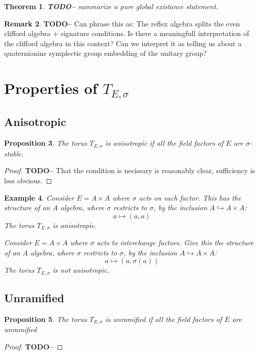 \documentclass{article}
\theoremstyle{plain}
\newtheorem{theorem}{Theorem}[section]
\newtheorem{proposition}[theorem]{Proposition}
\newtheorem{example}[theorem]{Example}
\theoremstyle{definition}
\newtheorem{remark}[theorem]{Remark}
\newcommand{\TODO}[1]{\textbf{TODO-#1}}
\begin{document}
\begin{theorem}
\TODO - summarize a pure global existance statement.
\end{theorem}

\begin{remark}
\TODO - Can phrase this as: The reflex algebra splits the even clifford algebra + signature conditions.
Is there a meaningfull interpretation of the clifford algebra in this context?
Can we interpret it as telling us about a quaternioninc symplectic group embedding of the unitary group?
\end{remark}




\section{Properties of $T_{E,\sigma}$}

\subsection{Anisotropic}

\begin{proposition}
The torus $T_{E,\sigma}$ is anisotropic if all the field factors of $E$ are $\sigma$-stable.
\end{proposition}
\begin{proof}
\TODO-
That the condition is necissary is reasonably clear, sufficiency is less obvious.
\end{proof}

\begin{example}
Consider $E = A \times A$ where $\sigma$ acts on each factor.
This has the structure of an $A$ algebra, where $\sigma$ restricts to $\sigma$, by the inclusion $A\hookrightarrow A\times A$:
\[ a \mapsto (a,a) \]
The torus $T_{E,\sigma}$ is anisotropic.

\bigskip
Consider $E = A \times A$ where $\sigma$ acts to interchange factors.
Give this the structure of an $A$ algebra, where $\sigma$ restricts to $\sigma$, by the inclusion $A\hookrightarrow A\times A$:
\[ a \mapsto (a,\sigma(a)) \]
The torus $T_{E,\sigma}$ is not anisotropic.
\end{example}


\subsection{Unramified}

\begin{proposition}
The torus $T_{E,\sigma}$ is unramified if all the field factors of $E$ are unramified
\end{proposition}
\begin{proof}
\TODO-
\end{proof}
\end{document}
